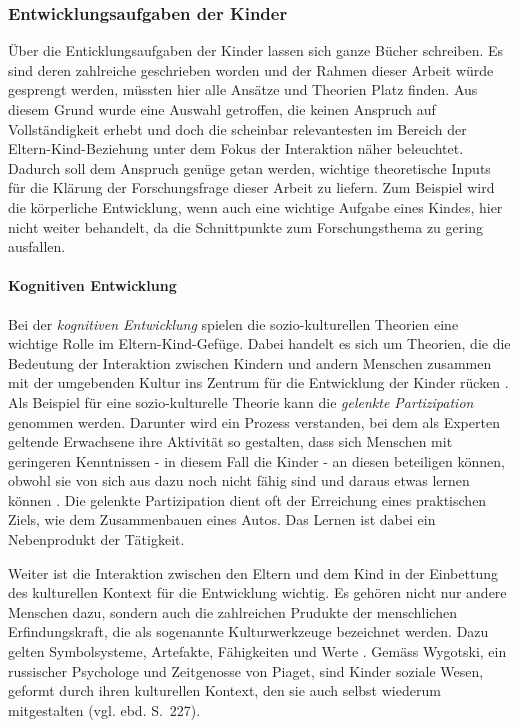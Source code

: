 \subsubsection{Entwicklungsaufgaben der Kinder}\label{sec:Entwicklungsaufgaben} Über die Enticklungsaufgaben der Kinder lassen sich ganze Bücher schreiben. Es sind deren zahlreiche geschrieben worden und der Rahmen dieser Arbeit würde gesprengt werden, müssten hier alle Ansätze und Theorien Platz finden. Aus diesem Grund wurde eine Auswahl getroffen, die keinen Anspruch auf Vollständigkeit erhebt und doch die scheinbar relevantesten im Bereich der Eltern-Kind-Beziehung unter dem Fokus der Interaktion näher beleuchtet. Dadurch soll dem Anspruch genüge getan werden, wichtige theoretische Inputs für die Klärung der Forschungsfrage dieser Arbeit zu liefern. Zum Beispiel wird die körperliche Entwicklung, wenn auch eine wichtige Aufgabe eines Kindes, hier nicht weiter behandelt, da die Schnittpunkte zum Forschungsthema zu gering ausfallen.

\paragraph{Kognitiven Entwicklung}\label{par:KognitiveEntwicklung}
Bei der \textit{kognitiven Entwicklung} spielen die sozio-kulturellen Theorien eine wichtige Rolle im Eltern-Kind-Gefüge. Dabei handelt es sich um Theorien, die die Bedeutung der Interaktion zwischen Kindern und andern Menschen zusammen mit der umgebenden Kultur ins Zentrum für die Entwicklung der Kinder rücken \cite[S.~225ff]{Siegler2008}. Als Beispiel für eine sozio-kulturelle Theorie kann die \textit{gelenkte Partizipation} genommen werden. Darunter wird ein Prozess verstanden, bei dem als Experten geltende Erwachsene ihre Aktivität so gestalten, dass sich Menschen mit geringeren Kenntnissen - in diesem Fall die Kinder - an diesen beteiligen können, obwohl sie von sich aus dazu noch nicht fähig sind und daraus etwas lernen können \cite{Rogoff1990}. Die gelenkte Partizipation dient oft der Erreichung eines praktischen Ziels, wie dem Zusammenbauen eines Autos. Das Lernen ist dabei ein Nebenprodukt der Tätigkeit.

Weiter ist die Interaktion zwischen den Eltern und dem Kind in der Einbettung des kulturellen Kontext für die Entwicklung wichtig. Es gehören nicht nur andere Menschen dazu, sondern auch die zahlreichen Prudukte der menschlichen Erfindungskraft, die als sogenannte Kulturwerkzeuge bezeichnet werden. Dazu gelten Symbolsysteme, Artefakte, Fähigkeiten und Werte \cite[S.~226]{Siegler2008}. Gemäss Wygotski, ein russischer Psychologe und Zeitgenosse von Piaget, sind Kinder soziale Wesen, geformt durch ihren kulturellen Kontext, den sie auch selbst wiederum mitgestalten (vgl. ebd. S.~227). 

